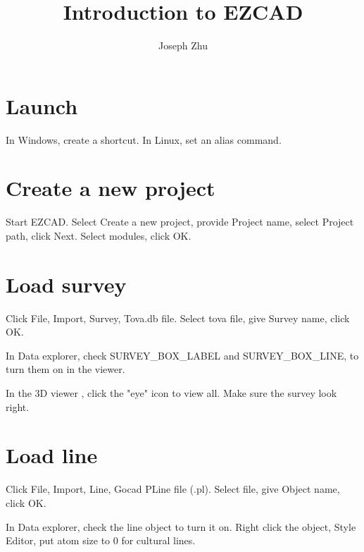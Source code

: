 \documentclass[12pt]{article}
\begin{document}
\title{Introduction to EZCAD}
\author{Joseph Zhu}


\section{Launch}
In Windows, create a shortcut.
In Linux, set an alias command.

\section{Create a new project}
Start EZCAD. Select \textsf{Create a new project}, provide \textsf{Project name},
select \textsf{Project path}, click \textsf{Next}.
\textsf{Select modules}, click \textsf{OK}.


\section{Load survey}
Click \textsf{File}, \textsf{Import}, \textsf{Survey}, \textsf{Tova.db file}.
Select \textsf{tova file}, give \textsf{Survey name}, click \textsf{OK}.

In \textsf{Data explorer}, check \textsf{SURVEY\_BOX\_LABEL} and
 \textsf{SURVEY\_BOX\_LINE}, to turn them on in the viewer.

In the 3D viewer , click the "eye" icon to view all.
Make sure the survey look right.

\section{Load line}

Click \textsf{File}, \textsf{Import}, \textsf{Line}, \textsf{Gocad PLine file
(.pl)}. Select file, give \textsf{Object name}, click \textsf{OK}.

In \textsf{Data explorer}, check the line object to turn it on. Right click
the object, \textsf{Style Editor}, put atom size to 0 for cultural lines.
\end{document}
